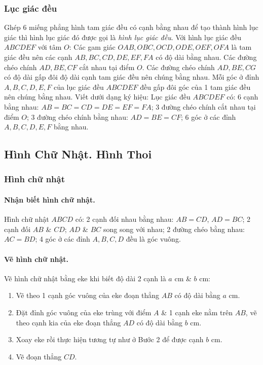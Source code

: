 \documentclass{article}
\numberwithin{equation}{section}
\begin{document}
\subsubsection{Lục giác đều}
Ghép 6 miếng phẳng hình tam giác đều có cạnh bằng nhau để tạo thành hình lục giác thì hình lục giác đó được gọi là \emph{hình lục giác đều}. Với hình lục giác đều $ABCDEF$ với tâm $O$: Các gam giác $OAB,OBC,OCD,ODE,OEF,OFA$ là tam giác đều nên các cạnh $AB,BC,CD,DE,EF,FA$ có độ dài bằng nhau. Các đường chéo chính $AD,BE,CF$ cắt nhau tại điểm $O$. Các đường chéo chính $AD,BE,CG$ có độ dài gấp đôi độ dài cạnh tam giác đều nên chúng bằng nhau. Mỗi góc ở đỉnh $A,B,C,D,E,F$ của lục giác đều $ABCDEF$ đều gấp đôi góc của 1 tam giác đều nên chúng bằng nhau. Viết dưới dạng ký hiệu: Lục giác đều $ABCDEF$ có: 6 cạnh bằng nhau: $AB = BC = CD = DE = EF = FA$; 3 đường chéo chính cắt nhau tại điểm $O$; 3 đường chéo chính bằng nhau: $AD = BE = CF$; 6 góc ở các đỉnh $A,B,C,D,E,F$ bằng nhau.

\subsection{Hình Chữ Nhật. Hình Thoi}

\subsubsection{Hình chữ nhật}

\paragraph{Nhận biết hình chữ nhật.} Hình chữ nhật $ABCD$ có: 2 cạnh đối nhau bằng nhau: $AB = CD$, $AD = BC$; 2 cạnh đối $AB$ \& $CD$; $AD$ \& $BC$ song song với nhau; 2 đường chéo bằng nhau: $AC = BD$; 4 góc ở các đỉnh $A,B,C,D$ đều là góc vuông.

\paragraph{Vẽ hình chữ nhật.} Vẽ hình chữ nhật bằng eke khi biết độ dài 2 cạnh là $a$ cm \& $b$ cm:
\begin{enumerate}
	\item Vẽ theo 1 cạnh góc vuông của eke đoạn thẳng $AB$ có độ dài bằng $a$ cm.
	\item Đặt đỉnh góc vuông của eke trùng với điểm $A$ \& 1 cạnh eke nằm trên $AB$, vẽ theo cạnh kia của eke đoạn thẳng $AD$ có độ dài bằng $b$ cm.
	\item Xoay eke rồi thực hiện tương tự như ở Bước 2 để được cạnh $b$ cm.
	\item Vẽ đoạn thẳng $CD$.
\end{enumerate}
\end{document}
